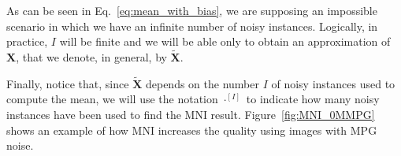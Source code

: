 \documentclass{article}
\begin{document}

As can be seen in Eq.~\ref{eq:mean_with_bias}, we are supposing an
impossible scenario in which we have an infinite number of noisy
instances. Logically, in practice, $I$ will be finite and we will be
able only to obtain an approximation of ${\mathbf X}$, that we denote,
in general, by $\tilde{\mathbf X}$.

Finally, notice that, since $\tilde{\mathbf X}$ depends on the number
$I$ of noisy instances used to compute the mean, we will use the
notation $\cdot^{[I]}$ to indicate how many noisy instances have
been used to find the MNI result. Figure~\ref{fig:MNI_0MMPG}
shows an example of how MNI increases the quality using images with
MPG noise.
  
\end{document}
